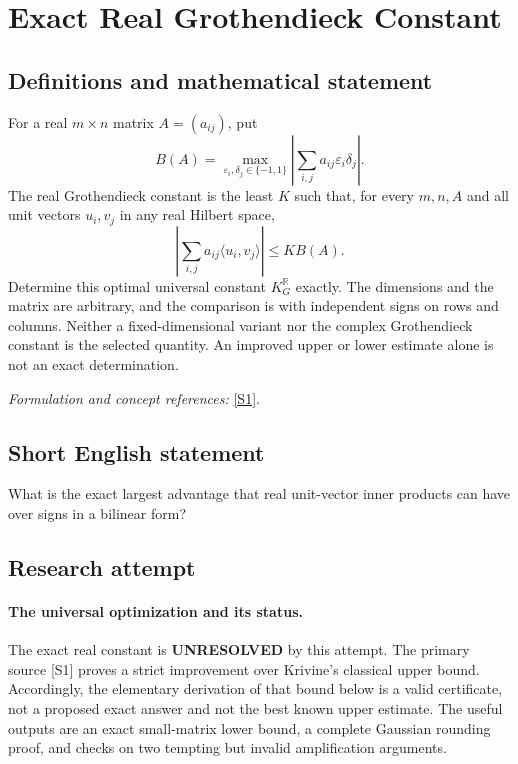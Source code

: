 \documentclass[11pt]{article}
\begin{document}
\section*{\texorpdfstring{Exact Real Grothendieck Constant}{Exact Real Grothendieck Constant}}\label{310}
\subsection{Definitions and mathematical statement}
For a real $m\times n$ matrix $A=(a_{ij})$, put
\[
 B(A)=\max_{{\varepsilon}_i,\delta_j\in\{-1,1\}}
 \left|\sum_{i,j}a_{ij}{\varepsilon}_i\delta_j\right|.
\]
The real Grothendieck constant is the least $K$ such that, for every $m,n,A$ and all unit vectors $u_i,v_j$ in any real Hilbert space,
\[
 \left|\sum_{i,j}a_{ij}\langle u_i,v_j\rangle\right|\le K B(A).
\]
Determine this optimal universal constant $K_G^{{\mathbb{R}}}$ exactly. The dimensions and the matrix are arbitrary, and the comparison is with independent signs on rows and columns. Neither a fixed-dimensional variant nor the complex Grothendieck constant is the selected quantity. An improved upper or lower estimate alone is not an exact determination.
\par\smallskip\textit{Formulation and concept references:} \href{https://arxiv.org/abs/1103.6161}{[S1]}.

\subsection{Short English statement}
What is the exact largest advantage that real unit-vector inner products can have over signs in a bilinear form?
\subsection{Research attempt}
\paragraph{The universal optimization and its status.}
The exact real constant is \textbf{UNRESOLVED} by this attempt.
The primary source [S1] proves a strict improvement over Krivine's
classical upper bound. Accordingly, the elementary derivation of
that bound below is a valid certificate, not a proposed exact answer
and not the best known upper estimate. The useful outputs are an
exact small-matrix lower bound, a complete Gaussian rounding proof,
and checks on two tempting but invalid amplification arguments.
\end{document}
